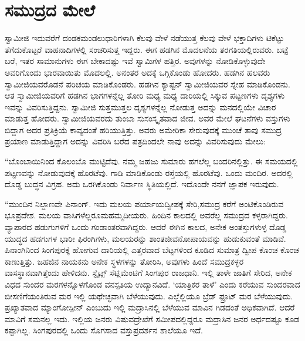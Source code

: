 
\chapter{ಸಮುದ್ರದ ಮೇಲೆ}

 ಸ್ವಾಮೀಜಿ ಇದುವರೆಗೆ ದಂಡಕಮಂಡಲುಧಾರಿಗಳಾಗಿ ಕೆಲವು ವೇಳೆ ನಡೆಯುತ್ತ ಕೆಲವು ವೇಳೆ ಭಕ್ತಾದಿಗಳು ಟಿಕೆಟ್ಟು ತೆಗೆದುಕೊಟ್ಟರೆ ವಾಹನಾದಿಗಳಲ್ಲಿ ಸಂಚರಿಸುತ್ತ ಇದ್ದರು. ಈಗ ಹಡಗಿನ ಮೊದಲನೆಯ ತರಗತಿಯಲ್ಲಿರುವರು. ಬಟ್ಟೆ ಬರೆ, ಇತರ ಸಾಮಾನುಗಳು ಈಗ ಬೇಕಾದಷ್ಟು ಇವೆ ಸ್ವಾಮಿಗಳ ಹತ್ತಿರ. ಅವುಗಳನ್ನು ನೋಡಿಕೊಳ್ಳುವುದೇ ಅವರಿಗೊಂದು ಭಾರವಾಯಿತು ಮೊದಲಲ್ಲಿ. ಅನಂತರ ಅದಕ್ಕೆ ಒಗ್ಗಿಕೊಂಡು ಹೋದರು. ಹಡಗಿನ ಹಲವರು ಸ್ವಾಮೀಜಿಯವರೊಡನೆ ಪರಿಚಯ ಮಾಡಿಕೊಂಡರು. ಹಡಗಿನ ಕ್ಯಾಪ್ಟನ್ ಸ್ವಾಮೀಜಿಯವರ ಸ್ನೇಹ ಮಾಡಿಕೊಂಡನು. ಆತ ಸ್ವಾಮೀಜಿಯವರಿಗೆ ಹಡಗಿನ ಭಾಗಗಳನ್ನೆಲ್ಲ ತೋರಿ ಮಧ್ಯ ಮಧ್ಯ ದಾರಿಯಲ್ಲಿ ಸಿಕ್ಕುವ ಪಟ್ಟಣಗಳು ದೃಶ್ಯಗಳು ಇವನ್ನು ವಿವರಿಸುತ್ತಿದ್ದನು. ಸ್ವಾಮೀಜಿ ಸುತ್ತಮುತ್ತಲ ದೃಶ್ಯಗಳನ್ನೆಲ್ಲ ನೋಡುತ್ತ ಅದನ್ನು ಮನದಲ್ಲಿಯೇ ವಿಚಾರ ಮಾಡುತ್ತ ಹೋದರು. ಸ್ವಾಮೀಜಿಯವರದು ತುಂಬಾ ಸುಸಂಸ್ಕೃತವಾದ ಜೀವ. ಅವರ ಮೇಲೆ ಘಟನೆಗಳು ವಸ್ತುಗಳು ಬಿದ್ದಾಗ ಅದರ ಪ್ರತಿಕ್ರಿಯೆ ಕಾವ್ಯದಂತೆ ಹರಿಯುತ್ತಿತ್ತು. ಅವರು ಅಮೇರಿಕಾ ಸೇರುವುದಕ್ಕೆ ಮುಂಚೆ ತಾವು ಸಮುದ್ರ ಪ್ರಯಾಣ ಮಾಡುತ್ತಿದ್ದಾಗ ಅದನ್ನು ವಿವರಿಸಿ ಬರೆದ ಪತ್ರದಿಂದಲೇ ನಾವು ಅದನ್ನು ವಿವರಿಸುವುದು ಮೇಲು: 

 “ಬೊಂಬಾಯಿನಿಂದ ಕೊಲಂಬೊ ಮುಟ್ಟಿದೆವು. ನಮ್ಮ ಜಹಜು ಸುಮಾರು ಹಗಲೆಲ್ಲ ಬಂದರಿನಲ್ಲಿತ್ತು. ಈ ಸಮಯದಲ್ಲಿ ಪಟ್ಟಣವನ್ನು ನೋಡುವುದಕ್ಕೆ ಹೊರಟೆವು. ಗಾಡಿ ಮಾಡಿಕೊಂಡು ರಸ್ತೆಯಲ್ಲಿ ಹೊರಟೆವು. ಒಂದು ಮಂದಿರ. ಅದರಲ್ಲಿ ದೊಡ್ಡ ಬುದ್ಧನ ವಿಗ್ರಹ. ಅದು ಒರಗಿಕೊಂಡು ನಿರ್ವಾಣ ಸ್ಥಿತಿಯಲ್ಲಿದೆ. ಇದೊಂದೇ ನನಗೆ ಜ್ಞಾಪಕ ಇರುವುದು.

 “ಮುಂದಿನ ನಿಲ್ದಾಣವೇ ಪಿನಾಂಗ್. ಇದು ಮಲಯ ಪರ್ಯಾಯದ್ವೀಪಕ್ಕೆ ಸೇರಿ,\break ಸಮುದ್ರ ಕರೆಗೆ ಅಂಟಿಕೊಂಡಿರುವ ಭೂಪ್ರದೇಶ. ಮಲಯ ವಾಸಿಗಳೆಲ್ಲರೂ\break ಮಹಮ್ಮದೀಯರು. ಹಿಂದಿನ ಕಾಲದಲ್ಲಿ ಅವರೆಲ್ಲ ಸಮುದ್ರದ ಕಳ್ಳರಾಗಿದ್ದರು. ವ್ಯಾಪಾರದ ಹಡುಗುಗಳಿಗೆ ಒಂದು ಗಂಡಾಂತರವಾಗಿದ್ದರು. ಆದರೆ ಈಗಿನ ಕಾಲದ, ಅನೇಕ ಅಂತಸ್ತುಗಳುಳ್ಳ ದೊಡ್ಡ ಯುದ್ಧದ ಹಡಗುಗಳ ಭಾರೀ ಫಿರಂಗಿಗಳು, ಮಲಯರನ್ನು ಶಾಂತಜೀವನೋಪಾಯವನ್ನು ಹುಡುಕುವಂತೆ ಮಾಡಿವೆ. ಪಿನಾಂಗಿನಿಂದ ಸಿಂಗಪುರಕ್ಕೆ ಹೋಗುವ ದಾರಿಯಲ್ಲಿ ಎತ್ತರವಾದ ಬೆಟ್ಟಗಳಿಂದ ಕೂಡಿದ ಸುಮಾತ್ರ ದ್ವೀಪ ಕೊಂಚ ಕೊಂಚ ಕಾಣುತ್ತಿತ್ತು. ಜಹಜಿನ ನಾಯಕನು ಅನೇಕ ಸ್ಥಳಗಳನ್ನು ತೋರಿಸಿ, ಅವುಗಳು ಹಿಂದೆ ಸಮುದ್ರಕಳ್ಳರ ವಾಸಸ್ಥಾನವಾಗಿತ್ತೆಂದು ಹೇಳಿದನು. ಸ್ಟೈಟ್ಸ್ ಸೆಟ್ಲಿಮೆಂಟಿಗೆ ಸಿಂಗಪುರ ರಾಜಧಾನಿ. ಇಲ್ಲಿ ತಾಳೇ ಜಾತಿಗೆ ಸೇರಿದ, ಅನೇಕ ವಿಧದ ಸುಂದರ ಮರಗಳನ್ನೊಳಗೊಂಡ ವನಸ್ಪತಿಯ ಉದ್ಯಾನವಿದೆ. ‘ಯಾತ್ರಿಕರ ತಾಳೆ’ ಎಂದು ಕರೆಯುವ ಸುಂದರವಾದ ಬೀಸಣಿಗೆಯಂತಿರುವ ಮರ ಇಲ್ಲಿ ಯಥೇಚ್ಛವಾಗಿ ಬೆಳೆಯುವುದು. ಎಲ್ಲೆಲ್ಲಿಯೂ ಬ್ರೆಡ್ ಫ್ರೂಟ್ ಮರ ಬೆಳೆಯುವುದು. ಪ್ರಖ್ಯಾತವಾದ ಮ್ಯಾಂಗೋಸ್ಪೀನ್ ಎಂಬುದು ಇಲ್ಲಿ ಮದ್ರಾಸಿನಲ್ಲಿ ಬೆಳೆಯುವ ಮಾವಿನ ಗಿಡದಂತೆ ಅಧಿಕವಾಗಿದೆ. ಆದರೆ ಮಾವಿಗೆ ಸಮನಲ್ಲ ಇದು. ಇಲ್ಲಿಯ ಜನರು ವಿಷುವದ್ರೇಖೆಗೆ ಸಮೀಪದಲ್ಲಿದ್ದರೂ ಮದ್ರಾಸಿನ ಜನರ ಅರ್ಧದಷ್ಟೂ ಕೂಡ ಕಪ್ಪಾಗಿಲ್ಲ. ಸಿಂಗಪುರದಲ್ಲಿ ಒಂದು ಸೊಗಸಾದ ವಸ್ತುಪ್ರದರ್ಶನ ಶಾಲೆಯೂ ಇದೆ.

